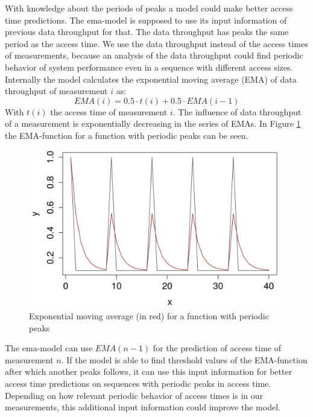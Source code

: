 \documentclass{superfri}
\begin{document}
	With knowledge about the periods of peaks a model could make better access time predictions.
	The ema-model is supposed to use its input information of previous data throughput for that.
	The data throughput has peaks the same period as the access time. We use the data throughput instead of the access times of measurements, because an analysis of the data throughput could find periodic behavior of system performance even in a sequence with different access sizes. 
	Internally the model calculates the exponential moving average (EMA) of data throughput of measurement $i$ as:
	\begin{equation}
	EMA(i) = 0.5 \cdot t(i)+ 0.5 \cdot EMA(i-1)
	\end{equation}
	With $t(i)$ the access time of measurement $i$.
	The influence of data throughput of a measurement is exponentially decreasing in the series of EMAs.
	In Figure \ref{periodic} the EMA-function for a function with periodic peaks can be seen.
	\begin{figure}[t]
		\centering
		\begin{minipage}[b]{0.47\textwidth}
			\includegraphics[width=\textwidth]{src/ema.png}
			\caption{Exponential moving average (in red) for a function with periodic peaks}
			\label{periodic}
		\end{minipage}
	\end{figure}	
	The ema-model can use $EMA(n-1)$ for the prediction of access time of measurement $n$.
	If the model is able to find threshold values of the EMA-function after which another peaks follows, it can use this input information for better access time predictions on sequences with periodic peaks in access time. Depending on how relevant periodic behavior of access times is in our measurements, this additional input information could improve the model.\medskip
	
\end{document}
